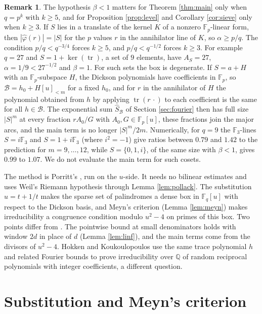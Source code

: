 \documentclass[11pt]{amsart}
\theoremstyle{definition}
\newtheorem{remark}[theorem]{Remark}
\newcommand{\F}{\mathbb{F}}
\newcommand{\cB}{\mathcal{B}}
\newcommand{\tr}{\operatorname{tr}}
\begin{document}
\begin{remark}
The hypothesis $\beta<1$ matters for Theorem \ref{thm:main} only when $q=p^k$ with $k\ge5$, and for Proposition \ref{prop:level} and Corollary \ref{cor:sieve} only when $k\ge3$. If $S$ lies in a translate of the kernel $K$ of a nonzero $\F_p$-linear form, then $|\hat\varphi(r)|=|S|$ for the $p$ values $r$ in the annihilator line of $K$, so $\alpha\ge p/q$. The condition $p/q<q^{-3/4}$ forces $k\ge5$, and $p/q<q^{-1/2}$ forces $k\ge3$. For example $q=27$ and $S=1+\ker(\tr)$, a set of $9$ elements, have $A_S=27$, $\alpha=1/9<27^{-1/2}$ and $\beta=1$. For such sets the box is degenerate. If $S=a+H$ with an $\F_p$-subspace $H$, the Dickson polynomials have coefficients in $\F_p$, so $\cB=h_0+H[u]_{<m}$ for a fixed $h_0$, and for $r$ in the annihilator of $H$ the polynomial obtained from $h$ by applying $\tr(r\,\cdot)$ to each coefficient is the same for all $h\in\cB$. The exponential sum $\hat S_\cB$ of Section \ref{sec:fourier} then has full size $|S|^m$ at every fraction $rA_0/G$ with $A_0,G\in\F_p[u]$, these fractions join the major arcs, and the main term is no longer $|S|^m/2m$. Numerically, for $q=9$ the $\F_3$-lines $S=i\F_3$ and $S=1+i\F_3$ (where $i^2=-1$) give ratios between $0.79$ and $1.42$ to the prediction for $m=9,\dots,12$, while $S=\{0,1,i\}$, of the same size with $\beta<1$, gives $0.99$ to $1.07$. We do not evaluate the main term for such cosets.
\end{remark}

The method is Porritt's \cite{Porritt}, run on the $u$-side. It needs no bilinear estimates and uses Weil's Riemann hypothesis through Lemma \ref{lem:pollack}. The substitution $u=t+1/t$ makes the sparse set of palindromes a dense box in $\F_q[u]$ with respect to the Dickson basis, and Meyn's criterion (Lemma \ref{lem:meyn}) makes irreducibility a congruence condition modulo $u^2-4$ on primes of this box. Two points differ from \cite{Porritt}. The pointwise bound at small denominators holds with window $2d$ in place of $d$ (Lemma \ref{lem:linf}), and the main terms come from the divisors of $u^2-4$. Hokken and Koukoulopoulos \cite{HokkenKoukoulopoulos} use the same trace polynomial $h$ and related Fourier bounds to prove irreducibility over $\mathbb{Q}$ of random reciprocal polynomials with integer coefficients, a different question.

\section{Substitution and Meyn's criterion}
\end{document}
